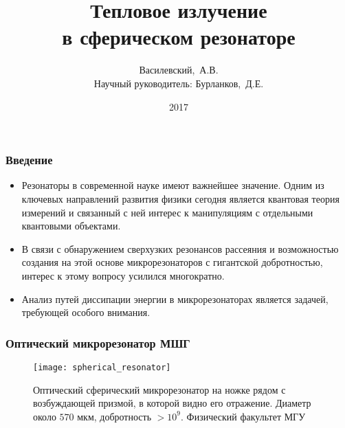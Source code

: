 \documentclass{beamer}
\title{Тепловое излучение\\ в сферическом резонаторе}
\author[Василевский,~А.В.]{
    Василевский,~А.В. \\[\baselineskip]
    {\footnotesize Научный руководитель: Бурланков,~Д.Е.}
}
\institute[ННГУ]{Нижегородский университет им. Н.И.~Лобачевского}
\date{2017}
\begin{document}

    \frame{\titlepage}


    \begin{frame}\frametitle{Введение}

        \begin{itemize}

            \item Резонаторы в современной науке имеют важнейшее значение. Одним из ключевых направлений развития физики сегодня является квантовая теория измерений и связанный с ней интерес к манипуляциям с отдельными квантовыми объектами.

            \item В связи с обнаружением сверхузких резонансов рассеяния и возможностью создания на этой основе микрорезонаторов с гигантской добротностью, интерес к этому вопросу усилился многократно.

            \item Анализ путей диссипации энергии в микрорезонаторах является задачей, требующей особого внимания.

        \end{itemize}

    \end{frame}


    \begin{frame}\frametitle{Оптический микрорезонатор МШГ}

        \begin{figure}[h]
            \centering
            \texttt{[image: spherical\_resonator]}
            \caption[]{Оптический сферический микрорезонатор на ножке рядом с возбуждающей призмой, в которой видно его отражение. Диаметр около $570$ мкм, добротность $> 10^9$. Физический факультет МГУ \cite{microresonators}}
            \label{fig:spherical_resonator}
        \end{figure}

    \end{frame}
\end{document}
